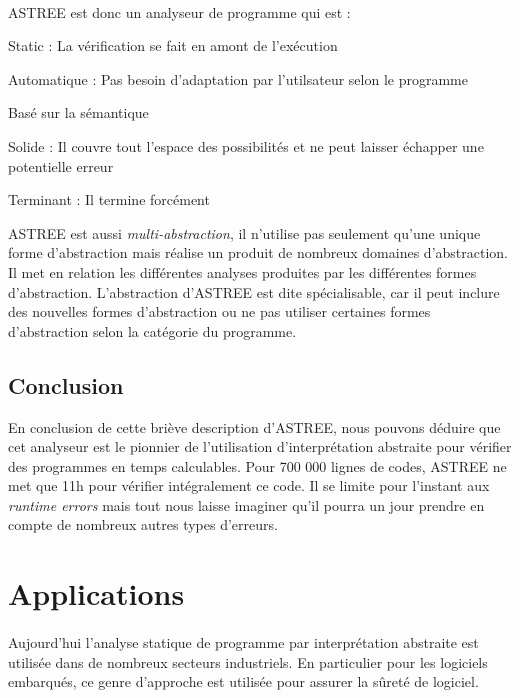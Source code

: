 \documentclass[french]{article}
\begin{document}
\paragraph{}
ASTREE est donc un analyseur de programme qui est :
\begin{description}
    \item Static : La vérification se fait en amont de l'exécution
    \item Automatique : Pas besoin d'adaptation par l'utilsateur selon le programme
    \item Basé sur la sémantique
    \item Solide : Il couvre tout l'espace des possibilités et ne peut laisser échapper une potentielle erreur
    \item Terminant : Il termine forcément
\end{description}
ASTREE est aussi \textit{multi-abstraction}, il n'utilise pas seulement qu'une unique forme d'abstraction mais réalise
un produit de nombreux domaines d'abstraction. Il met en relation les différentes analyses produites par les différentes
formes d'abstraction. L'abstraction d'ASTREE est dite spécialisable, car il peut inclure des nouvelles
formes d'abstraction ou ne pas utiliser certaines formes d'abstraction selon la catégorie du programme.


\subsection{Conclusion}
En conclusion de cette briève description d'ASTREE, nous pouvons déduire que cet analyseur est le pionnier de l'utilisation
d'interprétation abstraite pour vérifier des programmes en temps calculables. Pour 700 000 lignes
de codes, ASTREE ne met que 11h pour vérifier intégralement ce code.
Il se limite pour l'instant aux \textit{runtime errors} mais tout nous laisse imaginer qu'il
pourra un jour prendre en compte de nombreux autres types d'erreurs.


\section{Applications}

\paragraph{}
Aujourd'hui l'analyse statique de programme par interprétation abstraite est utilisée dans de nombreux secteurs industriels. En particulier pour les logiciels embarqués, ce genre d'approche est utilisée pour assurer la sûreté de logiciel. \\
\end{document}
